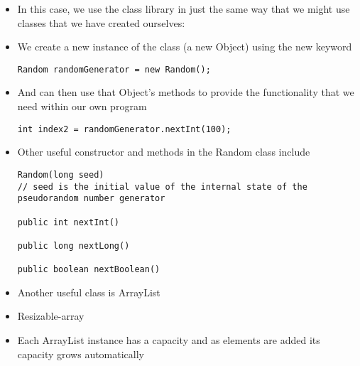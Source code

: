 \documentclass{beamer}
\begin{document}
\begin{frame}[fragile]
\begin{itemize}
\item In this case, we use the class library in just the same way that we might use classes that we have created ourselves:
\item We create a new instance of the class (a new Object) using the new keyword
\begin{block}{}
\begin{lstlisting}
Random randomGenerator = new Random();
\end{lstlisting}
\end{block}
\item And can then use that Object's methods to provide the functionality that we need within our own program
\begin{block}{}
\begin{lstlisting}
int index2 = randomGenerator.nextInt(100);
\end{lstlisting}
\end{block}
\end{itemize}
\end{frame} 

\begin{frame}[fragile]
\begin{itemize}
\item Other useful constructor and methods in the Random class include
\begin{block}{}
\begin{lstlisting}
Random(long seed)
// seed is the initial value of the internal state of the pseudorandom number generator

public int nextInt()

public long nextLong()

public boolean nextBoolean()
\end{lstlisting}
\end{block}
\end{itemize}
\end{frame} 

\begin{frame}
\begin{itemize}
\item Another useful class is ArrayList
\bigskip
\item Resizable-array
\item Each ArrayList instance has a capacity and as elements are added its capacity grows automatically
\end{itemize}
\end{frame} 
\end{document}
